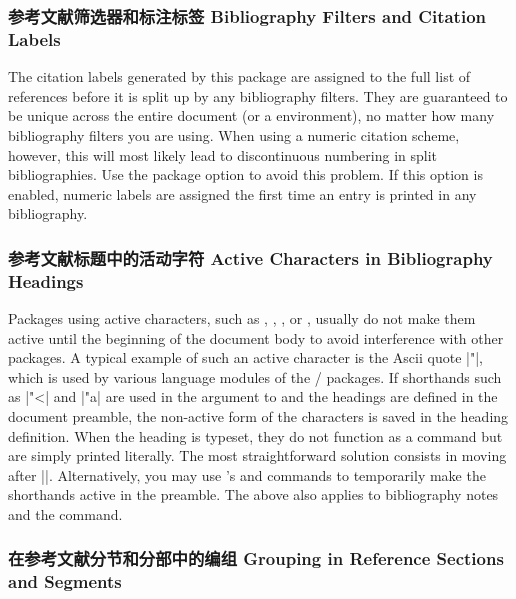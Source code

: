 \subsubsection{参考文献筛选器和标注标签 Bibliography Filters and Citation Labels}
\label{use:cav:lab}

The citation labels generated by this package are assigned to the full list of references before it is split up by any bibliography filters. They are guaranteed to be unique across the entire document (or a  environment), no matter how many bibliography filters you are using. When using a numeric citation scheme, however, this will most likely lead to discontinuous numbering in split bibliographies. Use the  package option to avoid this problem. If this option is enabled, numeric labels are assigned the first time an entry is printed in any bibliography.

\subsubsection{参考文献标题中的活动字符 Active Characters in Bibliography Headings}
\label{use:cav:act}

Packages using active characters, such as , , , or , usually do not make them active until the beginning of the document body to avoid interference with other packages. A typical example of such an active character is the Ascii quote |"|, which is used by various language modules of the / packages. If shorthands such as |"<| and |"a| are used in the argument to  and the headings are defined in the document preamble, the non-active form of the characters is saved in the heading definition. When the heading is typeset, they do not function as a command but are simply printed literally. The most straightforward solution consists in moving  after ||. Alternatively, you may use 's  and  commands to temporarily make the shorthands active in the preamble. The above also applies to bibliography notes and the  command.

\subsubsection{在参考文献分节和分部中的编组 Grouping in Reference Sections and Segments}
\label{use:cav:grp}


